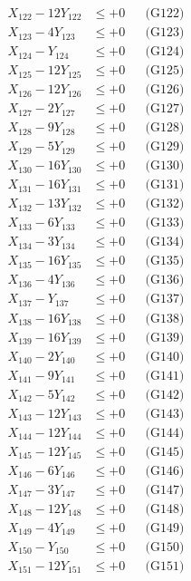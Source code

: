 \documentclass[a4paper,10pt]{article}
\begin{document}
{\begin{align}
\allowbreak
X_{122} - 12Y_{122} &\leq +0 && \text{(G122)} \\
X_{123} - 4Y_{123} &\leq +0 && \text{(G123)} \\
X_{124} - Y_{124} &\leq +0 && \text{(G124)} \\
X_{125} - 12Y_{125} &\leq +0 && \text{(G125)} \\
X_{126} - 12Y_{126} &\leq +0 && \text{(G126)} \\
X_{127} - 2Y_{127} &\leq +0 && \text{(G127)} \\
X_{128} - 9Y_{128} &\leq +0 && \text{(G128)} \\
X_{129} - 5Y_{129} &\leq +0 && \text{(G129)} \\
X_{130} - 16Y_{130} &\leq +0 && \text{(G130)} \\
X_{131} - 16Y_{131} &\leq +0 && \text{(G131)} \\
\allowbreak
X_{132} - 13Y_{132} &\leq +0 && \text{(G132)} \\
X_{133} - 6Y_{133} &\leq +0 && \text{(G133)} \\
X_{134} - 3Y_{134} &\leq +0 && \text{(G134)} \\
X_{135} - 16Y_{135} &\leq +0 && \text{(G135)} \\
X_{136} - 4Y_{136} &\leq +0 && \text{(G136)} \\
X_{137} - Y_{137} &\leq +0 && \text{(G137)} \\
X_{138} - 16Y_{138} &\leq +0 && \text{(G138)} \\
X_{139} - 16Y_{139} &\leq +0 && \text{(G139)} \\
X_{140} - 2Y_{140} &\leq +0 && \text{(G140)} \\
X_{141} - 9Y_{141} &\leq +0 && \text{(G141)} \\
\allowbreak
X_{142} - 5Y_{142} &\leq +0 && \text{(G142)} \\
X_{143} - 12Y_{143} &\leq +0 && \text{(G143)} \\
X_{144} - 12Y_{144} &\leq +0 && \text{(G144)} \\
X_{145} - 12Y_{145} &\leq +0 && \text{(G145)} \\
X_{146} - 6Y_{146} &\leq +0 && \text{(G146)} \\
X_{147} - 3Y_{147} &\leq +0 && \text{(G147)} \\
X_{148} - 12Y_{148} &\leq +0 && \text{(G148)} \\
X_{149} - 4Y_{149} &\leq +0 && \text{(G149)} \\
X_{150} - Y_{150} &\leq +0 && \text{(G150)} \\
X_{151} - 12Y_{151} &\leq +0 && \text{(G151)} \\

\end{align}}
\end{document}
